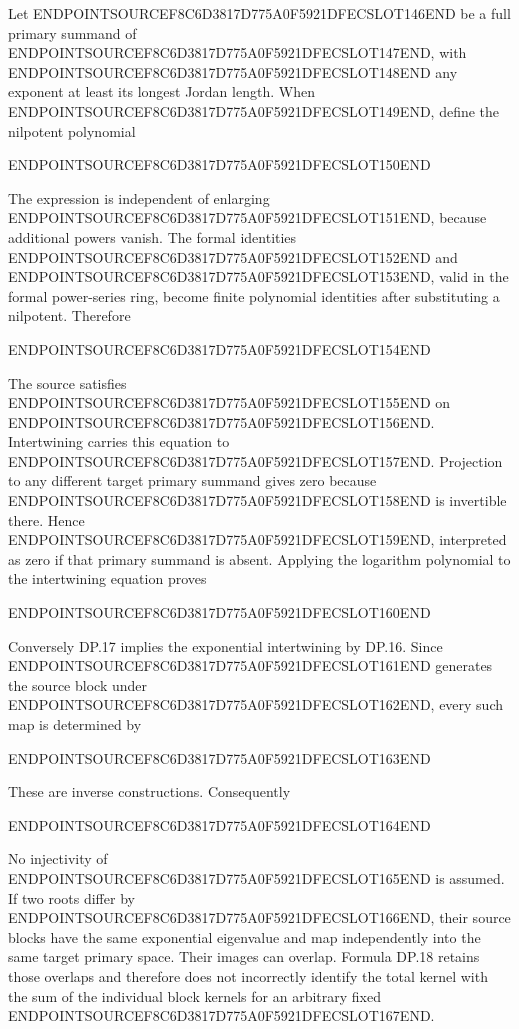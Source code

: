 Let ENDPOINTSOURCEF8C6D3817D775A0F5921DFECSLOT146END be a full primary summand of ENDPOINTSOURCEF8C6D3817D775A0F5921DFECSLOT147END, with ENDPOINTSOURCEF8C6D3817D775A0F5921DFECSLOT148END any exponent at least its longest Jordan length. When ENDPOINTSOURCEF8C6D3817D775A0F5921DFECSLOT149END, define the nilpotent polynomial

ENDPOINTSOURCEF8C6D3817D775A0F5921DFECSLOT150END

The expression is independent of enlarging ENDPOINTSOURCEF8C6D3817D775A0F5921DFECSLOT151END, because additional powers vanish. The formal identities ENDPOINTSOURCEF8C6D3817D775A0F5921DFECSLOT152END and ENDPOINTSOURCEF8C6D3817D775A0F5921DFECSLOT153END, valid in the formal power-series ring, become finite polynomial identities after substituting a nilpotent. Therefore

ENDPOINTSOURCEF8C6D3817D775A0F5921DFECSLOT154END

The source satisfies ENDPOINTSOURCEF8C6D3817D775A0F5921DFECSLOT155END on ENDPOINTSOURCEF8C6D3817D775A0F5921DFECSLOT156END. Intertwining carries this equation to ENDPOINTSOURCEF8C6D3817D775A0F5921DFECSLOT157END. Projection to any different target primary summand gives zero because ENDPOINTSOURCEF8C6D3817D775A0F5921DFECSLOT158END is invertible there. Hence ENDPOINTSOURCEF8C6D3817D775A0F5921DFECSLOT159END, interpreted as zero if that primary summand is absent. Applying the logarithm polynomial to the intertwining equation proves

ENDPOINTSOURCEF8C6D3817D775A0F5921DFECSLOT160END

Conversely DP.17 implies the exponential intertwining by DP.16. Since ENDPOINTSOURCEF8C6D3817D775A0F5921DFECSLOT161END generates the source block under ENDPOINTSOURCEF8C6D3817D775A0F5921DFECSLOT162END, every such map is determined by

ENDPOINTSOURCEF8C6D3817D775A0F5921DFECSLOT163END

These are inverse constructions. Consequently

ENDPOINTSOURCEF8C6D3817D775A0F5921DFECSLOT164END

No injectivity of ENDPOINTSOURCEF8C6D3817D775A0F5921DFECSLOT165END is assumed. If two roots differ by ENDPOINTSOURCEF8C6D3817D775A0F5921DFECSLOT166END, their source blocks have the same exponential eigenvalue and map independently into the same target primary space. Their images can overlap. Formula DP.18 retains those overlaps and therefore does not incorrectly identify the total kernel with the sum of the individual block kernels for an arbitrary fixed ENDPOINTSOURCEF8C6D3817D775A0F5921DFECSLOT167END.

